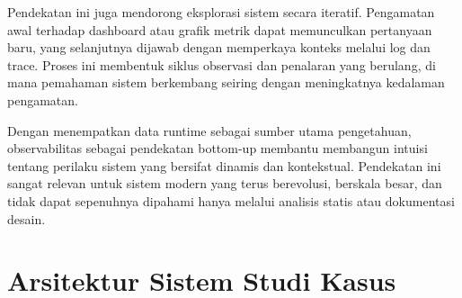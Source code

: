 Pendekatan ini juga mendorong eksplorasi sistem secara iteratif. Pengamatan awal terhadap dashboard atau grafik metrik dapat memunculkan pertanyaan baru, yang selanjutnya dijawab dengan memperkaya konteks melalui log dan trace. Proses ini membentuk siklus observasi dan penalaran yang berulang, di mana pemahaman sistem berkembang seiring dengan meningkatnya kedalaman pengamatan.

Dengan menempatkan data runtime sebagai sumber utama pengetahuan, observabilitas sebagai pendekatan bottom-up membantu membangun intuisi tentang perilaku sistem yang bersifat dinamis dan kontekstual. Pendekatan ini sangat relevan untuk sistem modern yang terus berevolusi, berskala besar, dan tidak dapat sepenuhnya dipahami hanya melalui analisis statis atau dokumentasi desain.




\section{Arsitektur Sistem Studi Kasus}


